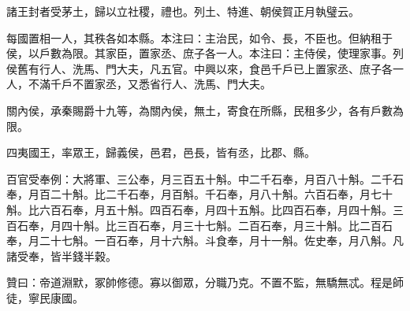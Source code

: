 \begin{pinyinscope}
諸王封者受茅土，歸以立社稷，禮也。列土、特進、朝侯賀正月執璧云。

每國置相一人，其秩各如本縣。本注曰：主治民，如令、長，不臣也。但納租于侯，以戶數為限。其家臣，置家丞、庶子各一人。本注曰：主侍侯，使理家事。列侯舊有行人、洗馬、門大夫，凡五官。中興以來，食邑千戶已上置家丞、庶子各一人，不滿千戶不置家丞，又悉省行人、洗馬、門大夫。

關內侯，承秦賜爵十九等，為關內侯，無土，寄食在所縣，民租多少，各有戶數為限。

四夷國王，率眾王，歸義侯，邑君，邑長，皆有丞，比郡、縣。

百官受奉例：大將軍、三公奉，月三百五十斛。中二千石奉，月百八十斛。二千石奉，月百二十斛。比二千石奉，月百斛。千石奉，月八十斛。六百石奉，月七十斛。比六百石奉，月五十斛。四百石奉，月四十五斛。比四百石奉，月四十斛。三百石奉，月四十斛。比三百石奉，月三十七斛。二百石奉，月三十斛。比二百石奉，月二十七斛。一百石奉，月十六斛。斗食奉，月十一斛。佐史奉，月八斛。凡諸受奉，皆半錢半穀。

贊曰：帝道淵默，冢帥修德。寡以御眾，分職乃克。不置不監，無驕無忒。程是師徒，寧民康國。


\end{pinyinscope}